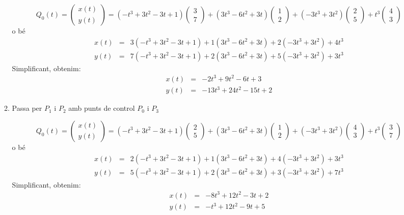 \begin{enumerate}
\begin{enumerate}
          \[
            Q_0(t)=\begin{pmatrix}x(t)\\y(t)\end{pmatrix}=(-t^3+3t^2-3t+1)\begin{pmatrix}3\\7\end{pmatrix}
                  +(3t^3-6t^2+3t)\begin{pmatrix}1\\2\end{pmatrix}
                  +(-3t^3+3t^2)\begin{pmatrix}2\\5\end{pmatrix}
                  +t^3\begin{pmatrix}4\\3\end{pmatrix}
          \]
          o bé
          \begin{eqnarray*}
            x(t)&=&3(-t^3+3t^2-3t+1)+1(3t^3-6t^2+3t)+2(-3t^3+3t^2)+4t^3\\
            y(t)&=&7(-t^3+3t^2-3t+1)+2(3t^3-6t^2+3t)+5(-3t^3+3t^2)+3t^3
          \end{eqnarray*}
          Simplificant, obtenim:
          \begin{eqnarray*}
            x(t)&=&-2t^3+9t^2-6t+3\\
            y(t)&=&-13t^3+24t^2-15t+2
          \end{eqnarray*}
          \blacksquare

  \item Passa per $P_1$ i $P_2$ amb punts de control $P_0$ i $P_3$


  \[
    Q_0(t)=\begin{pmatrix}x(t)\\y(t)\end{pmatrix}=(-t^3+3t^2-3t+1)\begin{pmatrix}2\\5\end{pmatrix}
          +(3t^3-6t^2+3t)\begin{pmatrix}1\\2\end{pmatrix}
          +(-3t^3+3t^2)\begin{pmatrix}4\\3\end{pmatrix}
          +t^3\begin{pmatrix}3\\7\end{pmatrix}
  \]
  o bé
  \begin{eqnarray*}
    x(t)&=&2(-t^3+3t^2-3t+1)+1(3t^3-6t^2+3t)+4(-3t^3+3t^2)+3t^3\\
    y(t)&=&5(-t^3+3t^2-3t+1)+2(3t^3-6t^2+3t)+3(-3t^3+3t^2)+7t^3
  \end{eqnarray*}
  Simplificant, obtenim:
  \begin{eqnarray*}
    x(t)&=&-8t^3+12t^2-3t+2\\
    y(t)&=&-t^3+12t^2-9t+5
  \end{eqnarray*}
\blacksquare



\end{enumerate}
\end{enumerate}
